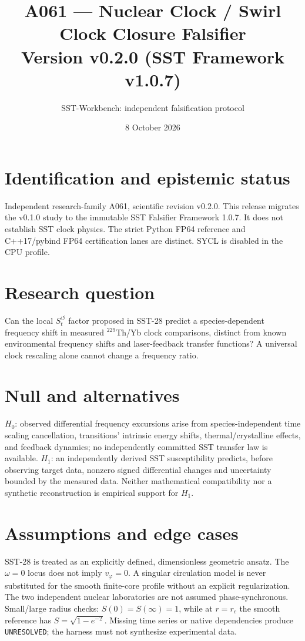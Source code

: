 \documentclass[11pt,a4paper]{article}
\title{A061 --- Nuclear Clock / Swirl Clock Closure Falsifier\\Version v0.2.0 (SST Framework v1.0.7)}
\author{SST-Workbench: independent falsification protocol}
\date{8 October 2026}
\newcommand{\rc}{r_c}
\begin{document}
\maketitle
\section{Identification and epistemic status}
Independent research-family A061, scientific revision v0.2.0. This release migrates the v0.1.0 study to the immutable SST Falsifier Framework 1.0.7. It does not establish SST clock physics. The strict Python FP64 reference and C++17/pybind FP64 certification lanes are distinct. SYCL is disabled in the CPU profile.
\section{Research question}
Can the local $S_t^{\circlearrowleft}$ factor proposed in SST-28 predict a species-dependent frequency shift in measured $^{229}$Th/Yb clock comparisons, distinct from known environmental frequency shifts and laser-feedback transfer functions? A universal clock rescaling alone cannot change a frequency ratio.
\section{Null and alternatives}
$H_0$: observed differential frequency excursions arise from species-independent time scaling cancellation, transitions' intrinsic energy shifts, thermal/crystalline effects, and feedback dynamics; no independently committed SST transfer law is available. $H_1$: an independently derived SST susceptibility predicts, before observing target data, nonzero signed differential changes and uncertainty bounded by the measured data. Neither mathematical compatibility nor a synthetic reconstruction is empirical support for $H_1$.
\section{Assumptions and edge cases}
SST-28 is treated as an explicitly defined, dimensionless geometric ansatz. The $\omega=0$ locus does not imply $v_\varphi=0$. A singular circulation model is never substituted for the smooth finite-core profile without an explicit regularization. The two independent nuclear laboratories are not assumed phase-synchronous. Small/large radius checks: $S(0)=S(\infty)=1$, while at $r=\rc$ the smooth reference has $S=\sqrt{1-e^{-2}}$. Missing time series or native dependencies produce \texttt{UNRESOLVED}; the harness must not synthesize experimental data.
\end{document}
